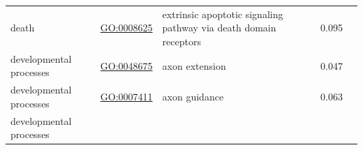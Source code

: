 \documentclass[
]{article}
\begin{document}
\begin{longtable}[]{@{}lllll@{}}
\begin{minipage}[t]{0.17\columnwidth}
death\strut
\end{minipage} & \begin{minipage}[t]{0.17\columnwidth}\raggedright
\url{GO:0008625}\strut
\end{minipage} & \begin{minipage}[t]{0.17\columnwidth}\raggedright
extrinsic apoptotic signaling pathway via death domain receptors\strut
\end{minipage} & \begin{minipage}[t]{0.17\columnwidth}\raggedright
0.095\strut
\end{minipage} & \begin{minipage}[t]{0.17\columnwidth}\raggedright
\strut
\end{minipage}\tabularnewline
\begin{minipage}[t]{0.17\columnwidth}\raggedright
developmental processes\strut
\end{minipage} & \begin{minipage}[t]{0.17\columnwidth}\raggedright
\url{GO:0048675}\strut
\end{minipage} & \begin{minipage}[t]{0.17\columnwidth}\raggedright
axon extension\strut
\end{minipage} & \begin{minipage}[t]{0.17\columnwidth}\raggedright
0.047\strut
\end{minipage} & \begin{minipage}[t]{0.17\columnwidth}\raggedright
\strut
\end{minipage}\tabularnewline
\begin{minipage}[t]{0.17\columnwidth}\raggedright
developmental processes\strut
\end{minipage} & \begin{minipage}[t]{0.17\columnwidth}\raggedright
\url{GO:0007411}\strut
\end{minipage} & \begin{minipage}[t]{0.17\columnwidth}\raggedright
axon guidance\strut
\end{minipage} & \begin{minipage}[t]{0.17\columnwidth}\raggedright
0.063\strut
\end{minipage} & \begin{minipage}[t]{0.17\columnwidth}\raggedright
\strut
\end{minipage}\tabularnewline
\begin{minipage}[t]{0.17\columnwidth}\raggedright
developmental processes\strut
\end{minipage} & \begin{minipage}[t]{0.17\columnwidth}\raggedright

\end{minipage}
\end{longtable}
\end{document}
